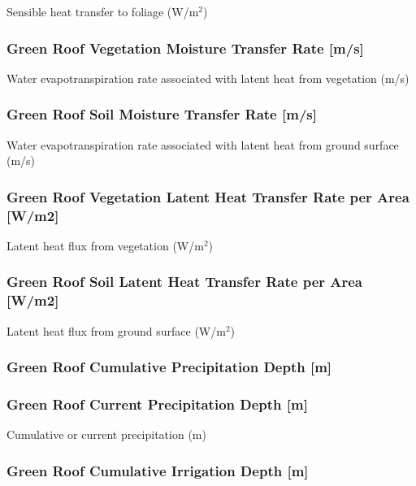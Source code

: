 Sensible heat transfer to foliage (W/m\(^{2}\))

\subsubsection{Green Roof Vegetation Moisture Transfer Rate {[}m/s{]}}\label{green-roof-vegetation-moisture-transfer-rate-ms}

Water evapotranspiration rate associated with latent heat from vegetation (m/s)

\subsubsection{Green Roof Soil Moisture Transfer Rate {[}m/s{]}}\label{green-roof-soil-moisture-transfer-rate-ms}

Water evapotranspiration rate associated with latent heat from ground surface (m/s)

\subsubsection{Green Roof Vegetation Latent Heat Transfer Rate per Area {[}W/m2{]}}\label{green-roof-vegetation-latent-heat-transfer-rate-per-area-wm2}

Latent heat flux from vegetation (W/m\(^{2}\))

\subsubsection{Green Roof Soil Latent Heat Transfer Rate per Area {[}W/m2{]}}\label{green-roof-soil-latent-heat-transfer-rate-per-area-wm2}

Latent heat flux from ground surface (W/m\(^{2}\))

\subsubsection{Green Roof Cumulative Precipitation Depth {[}m{]}}\label{green-roof-cumulative-precipitation-depth-m}

\subsubsection{Green Roof Current Precipitation Depth {[}m{]}}\label{green-roof-current-precipitation-depth-m}

Cumulative or current precipitation (m)

\subsubsection{Green Roof Cumulative Irrigation Depth {[}m{]}}\label{green-roof-cumulative-irrigation-depth-m}

